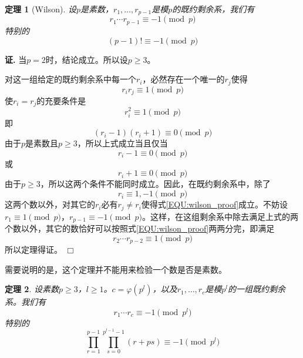 \documentclass{ctexrep}
\newtheorem{thrm}{定理}[section]
\renewenvironment{proof}[1][证]{\noindent \textbf{#1.} }{\hfill$\Box$}
\begin{document}
\begin{thrm}[Wilson]
设$p$是素数，$r_1,\dotsc,r_{p-1}$是模$p$的既约剩余系，我们有
\begin{equation}
r_1\dotsm r_{p-1}\equiv -1\pmod{p}
\end{equation}
特别的
\begin{equation}
(p-1)!\equiv -1\pmod{p}
\end{equation}
\end{thrm}
\begin{proof}
当$p=2$时，结论成立。所以设$p\geq 3$。

对这一组给定的既约剩余系中每一个$r_i$，必然存在一个唯一的$r_j$使得
\begin{equation}\label{EQU:wilson_proof}
r_i r_j\equiv 1\pmod{p}
\end{equation}
使$r_i=r_j$的充要条件是
\begin{displaymath}
r_i^2\equiv 1\pmod{p}
\end{displaymath}
即
\begin{displaymath}
(r_i-1)(r_i+1)\equiv 0\pmod{p}
\end{displaymath}
由于$p$是素数且$p\geq 3$，所以上式成立当且仅当
\begin{displaymath}
r_i-1\equiv 0\pmod{p}
\end{displaymath}
或
\begin{displaymath}
r_i+1\equiv 0\pmod{p}
\end{displaymath}
由于$p\geq 3$，所以这两个条件不能同时成立。因此，在既约剩余系中，除了
\begin{displaymath}
r_i\equiv 1,-1\pmod{p}
\end{displaymath}
这两个数以外，对其它的$r_i$必有$r_j\neq r_i$使得式\ref{EQU:wilson_proof}成立。不妨设$r_1\equiv 1\pmod{p}$，$r_{p-1}\equiv -1\pmod{p}$。这样，在这组剩余系中除去满足上式的两个数以外，其它的数恰好可以按照式\ref{EQU:wilson_proof}两两分完，即满足
\begin{displaymath}
r_2\dotsm r_{p-2}\equiv 1\pmod{p}
\end{displaymath}
所以定理得证。
\end{proof}

需要说明的是，这个定理并不能用来检验一个数是否是素数。

\begin{thrm}
设素数$p\geq 3$，$l\geq 1$。$c=\varphi(p^l)$，以及$r_1,\dotsc,r_c$是模$p^l$的一组既约剩余系。我们有
\begin{equation}
r_1\dotsm r_c\equiv -1\pmod{p^l}
\end{equation}
特别的
\begin{equation}
\prod_{r=1}^{p-1}\prod_{s=0}^{p^{l-1}-1}(r+ps)\equiv -1\pmod{p^l}
\end{equation}
\end{thrm}
\end{document}
